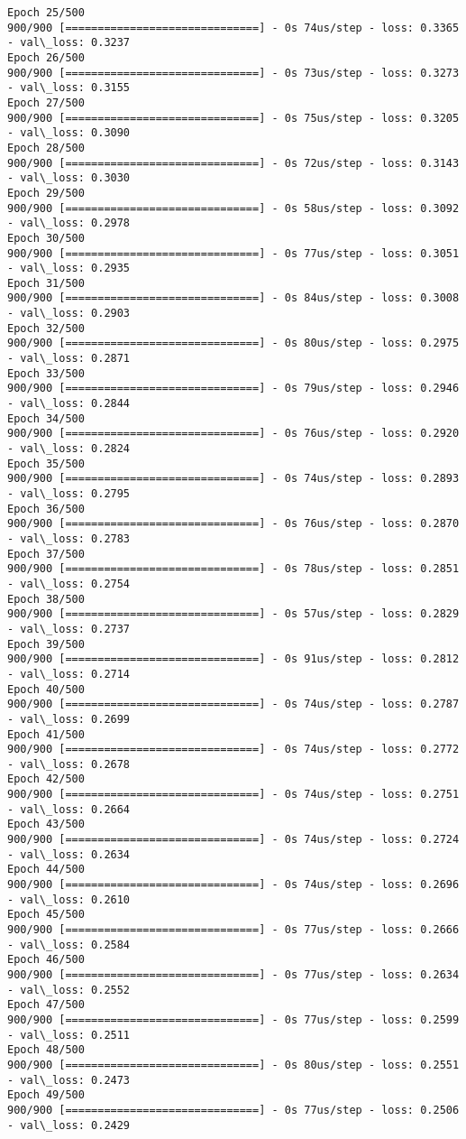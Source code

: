 \documentclass[11pt]{article}
\begin{document}
\begin{Verbatim}[commandchars=\\\{\}]
Epoch 25/500
900/900 [==============================] - 0s 74us/step - loss: 0.3365 - val\_loss: 0.3237
Epoch 26/500
900/900 [==============================] - 0s 73us/step - loss: 0.3273 - val\_loss: 0.3155
Epoch 27/500
900/900 [==============================] - 0s 75us/step - loss: 0.3205 - val\_loss: 0.3090
Epoch 28/500
900/900 [==============================] - 0s 72us/step - loss: 0.3143 - val\_loss: 0.3030
Epoch 29/500
900/900 [==============================] - 0s 58us/step - loss: 0.3092 - val\_loss: 0.2978
Epoch 30/500
900/900 [==============================] - 0s 77us/step - loss: 0.3051 - val\_loss: 0.2935
Epoch 31/500
900/900 [==============================] - 0s 84us/step - loss: 0.3008 - val\_loss: 0.2903
Epoch 32/500
900/900 [==============================] - 0s 80us/step - loss: 0.2975 - val\_loss: 0.2871
Epoch 33/500
900/900 [==============================] - 0s 79us/step - loss: 0.2946 - val\_loss: 0.2844
Epoch 34/500
900/900 [==============================] - 0s 76us/step - loss: 0.2920 - val\_loss: 0.2824
Epoch 35/500
900/900 [==============================] - 0s 74us/step - loss: 0.2893 - val\_loss: 0.2795
Epoch 36/500
900/900 [==============================] - 0s 76us/step - loss: 0.2870 - val\_loss: 0.2783
Epoch 37/500
900/900 [==============================] - 0s 78us/step - loss: 0.2851 - val\_loss: 0.2754
Epoch 38/500
900/900 [==============================] - 0s 57us/step - loss: 0.2829 - val\_loss: 0.2737
Epoch 39/500
900/900 [==============================] - 0s 91us/step - loss: 0.2812 - val\_loss: 0.2714
Epoch 40/500
900/900 [==============================] - 0s 74us/step - loss: 0.2787 - val\_loss: 0.2699
Epoch 41/500
900/900 [==============================] - 0s 74us/step - loss: 0.2772 - val\_loss: 0.2678
Epoch 42/500
900/900 [==============================] - 0s 74us/step - loss: 0.2751 - val\_loss: 0.2664
Epoch 43/500
900/900 [==============================] - 0s 74us/step - loss: 0.2724 - val\_loss: 0.2634
Epoch 44/500
900/900 [==============================] - 0s 74us/step - loss: 0.2696 - val\_loss: 0.2610
Epoch 45/500
900/900 [==============================] - 0s 77us/step - loss: 0.2666 - val\_loss: 0.2584
Epoch 46/500
900/900 [==============================] - 0s 77us/step - loss: 0.2634 - val\_loss: 0.2552
Epoch 47/500
900/900 [==============================] - 0s 77us/step - loss: 0.2599 - val\_loss: 0.2511
Epoch 48/500
900/900 [==============================] - 0s 80us/step - loss: 0.2551 - val\_loss: 0.2473
Epoch 49/500
900/900 [==============================] - 0s 77us/step - loss: 0.2506 - val\_loss: 0.2429

\end{Verbatim}
\end{document}
